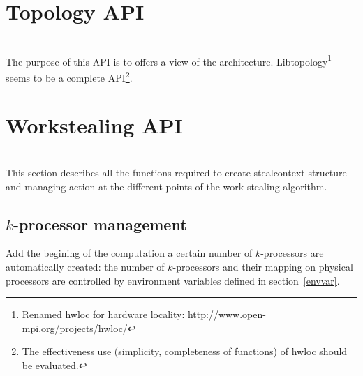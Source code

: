 \documentclass{report}
\begin{document}
\section{Topology API}
\\

The purpose of this API is to offers a view of the architecture. Libtopology\footnote{Renamed hwloc for hardware locality: http://www.open-mpi.org/projects/hwloc/} seems to be a complete API\footnote{The effectiveness use (simplicity, completeness of functions) of hwloc should be evaluated.}.

\section{Workstealing API}
\\

This section describes all the functions required to create stealcontext structure and managing action at the different points of the work stealing algorithm.


\subsection{$k$-processor management}

Add the begining of the computation a certain number of $k$-processors are automatically created: the number of $k$-processors and their mapping on physical processors are controlled by environment variables defined in section~\ref{envvar}.
\end{document}
